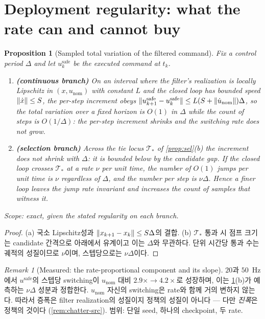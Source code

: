 \documentclass[11pt]{article}
\theoremstyle{plain}
\newtheorem{proposition}[theorem]{Proposition}
\theoremstyle{definition}
\theoremstyle{remark}
\newtheorem{remark}[theorem]{Remark}
\DeclarePairedDelimiter{\norm}{\lVert}{\rVert}
\newcommand{\calT}{\mathcal{T}}
\begin{document}
\section{Deployment regularity: what the rate can and cannot buy}\label{sec:rate}

\begin{proposition}[Sampled total variation of the filtered command]\label{prop:tv-rate}
Fix a control period $\Delta$ and let $u^{\mathrm{safe}}_k$ be the executed command at $t_k$.
\begin{enumerate}[label=(\alph*)]
  \item \textbf{(continuous branch)} On an interval where the filter's realization is locally
  Lipschitz in $(x,u_{\mathrm{nom}})$ with constant $L$ and the closed loop has bounded speed
  $\norm{\dot x}\le S$, the per-step increment obeys
  $\norm{u^{\mathrm{safe}}_{k+1}-u^{\mathrm{safe}}_k}\le L(S+\norm{\dot u_{\mathrm{nom}}})\Delta$,
  so the \emph{total} variation over a fixed horizon is $O(1)$ in $\Delta$ while the count of
  steps is $O(1/\Delta)$: the per-step increment shrinks and the switching \emph{rate} does not
  grow.
  \item \textbf{(selection branch)} Across the tie locus $\calT_\ast$ of \cref{prop:sel}(b) the
  increment does not shrink with $\Delta$: it is bounded below by the candidate gap. If the
  closed loop crosses $\calT_\ast$ at a rate $\nu$ per unit time, the number of $O(1)$ jumps
  per unit time is $\nu$ regardless of $\Delta$, and the number \emph{per step} is $\nu\Delta$.
  Hence a finer loop leaves the jump rate invariant and increases the count of samples that
  witness it.
\end{enumerate}
Scope: exact, given the stated regularity on each branch.
\end{proposition}
\begin{proof}
(a) 국소 Lipschitz성과 $\norm{x_{k+1}-x_k}\le S\Delta$의 결합. (b) $\calT_\ast$ 통과 시 점프
크기는 candidate 간격으로 아래에서 유계이고 이는 $\Delta$와 무관하다. 단위 시간당 통과 수는
궤적의 성질이므로 $\nu$이며, 스텝당으로는 $\nu\Delta$이다.
\end{proof}

\begin{remark}[Measured: the rate-proportional component and its slope]\label{rem:rate-slope}
$20$과 $50$~Hz에서 $u^{\mathrm{safe}}$의 스텝당 switching이 $u_{\mathrm{nom}}$ 대비
$2.9\times\to4.2\times$로 성장하며, 이는 \cref{prop:tv-rate}(b)가 예측하는 $\nu\Delta$ 성분과
정합한다. $u_{\mathrm{nom}}$ 자신의 switching은 rate와 함께 거의 변하지 않는다. 따라서 증폭은
filter realization의 성질이지 정책의 성질이 아니다 --- 다만 \emph{진폭}은 정책의 것이다
(\cref{rem:chatter-src}). 범위: 단일 seed, 하나의 checkpoint, 두 rate.
\end{remark}
\end{document}
